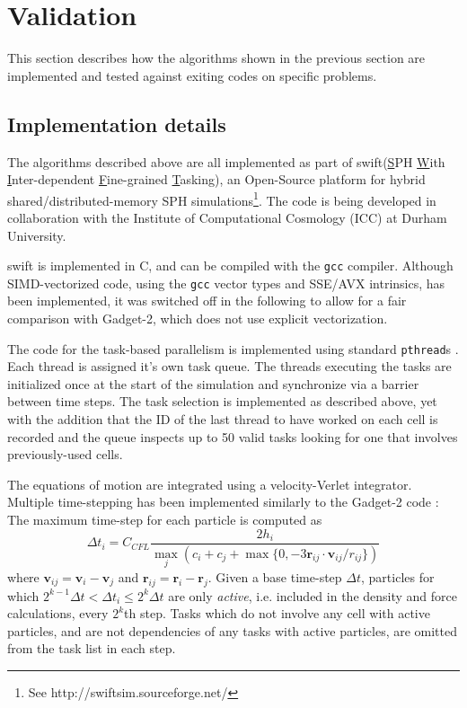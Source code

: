 \documentclass[final]{siamltex}
\newcommand{\swift}
    {{\sc swift}\xspace}
\begin{document}
\section{Validation}

This section describes how the algorithms shown in the previous section
are implemented and tested against exiting codes on specific problems.

\subsection{Implementation details}

The algorithms described above are all implemented as part
of \swift (\underline{S}PH \underline{W}ith
\underline{I}nter-dependent \underline{F}ine-grained
\underline{T}asking),
an Open-Source platform for hybrid shared/distributed-memory
SPH simulations\footnote{See http://swiftsim.sourceforge.net/}.
The code is being developed in collaboration with the Institute
of Computational Cosmology (ICC) at Durham University.

\swift is implemented in C, and can be compiled with the
{\tt gcc} compiler.
Although SIMD-vectorized code, using the {\tt gcc} vector types
and SSE/AVX intrinsics, has been implemented, it was switched
off in the following to allow for a fair comparison with
Gadget-2, which does not use explicit vectorization.

The code for the task-based parallelism is implemented using
standard {\tt pthread}s \cite{ref:pthreads}.
Each thread is assigned it's own task queue.
The threads executing the tasks are initialized once at the
start of the simulation
and synchronize via a barrier between time steps.
The task selection is implemented as described above, yet with the
addition that the ID of the last thread to have worked on each
cell is recorded and the queue inspects up to 50 valid tasks 
looking for one that involves previously-used cells.

The equations of motion are integrated using a velocity-Verlet
integrator.
Multiple time-stepping has been implemented similarly to
the Gadget-2 code \cite{ref:Springel2005}: The maximum time-step
for each particle is computed as
%
\begin{equation}
    \Delta t_i = C_{CFL}\frac{2 h_i}{ \max_j\left( c_i + c_j + \max\{0,-3 \mathbf r_{ij} \cdot \mathbf v_{ij} / r_{ij} \} \right) }
    \label{eqn:dt}
\end{equation}
%
where $\mathbf v_{ij} = \mathbf v_i - \mathbf v_j$ and
$\mathbf r_{ij} = \mathbf r_i - \mathbf r_j$.
Given a base time-step $\Delta t$, particles for which
$2^{k-1}\Delta t < \Delta t_i \leq 2^k\Delta t$ are only {\em active},
i.e. included in the density and force calculations, every $2^k$th step.
Tasks which do not involve any cell with active particles, and
are not dependencies of any tasks with active particles, are
omitted from the task list in each step.
\end{document}
